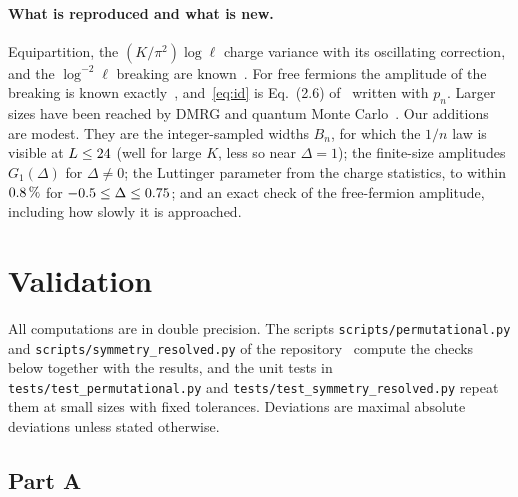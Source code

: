 \documentclass[11pt]{article}
\newcommand{\code}[1]{\nolinkurl{#1}}
\begin{document}
\paragraph{What is reproduced and what is new.} Equipartition, the $(K/\pi^2)\log\ell$ charge variance with its
oscillating correction, and the $\log^{-2}\ell$ breaking are
known~\cite{goldstein2018,xavier2018,bonsignori2019,song2012,estienne2021}. For free fermions the amplitude of the
breaking is known exactly~\cite{bonsignori2019}, and~\eqref{eq:id} is Eq.~(2.6) of~\cite{bonsignori2019} written with
$p_n$. Larger sizes have been reached by DMRG and quantum Monte Carlo~\cite{laflorencie2014,xavier2018,chen2026}. Our
additions are modest. They are the integer-sampled widths $B_n$, for which the $1/n$ law is visible at $L\le24$ (well
for large $K$, less so near $\Delta=1$); the finite-size amplitudes $G_1(\Delta)$ for $\Delta\ne0$; the Luttinger
parameter from the charge statistics, to within $0.8\,\%$ for $-0.5\le\Delta\le0.75$;
and an exact check of the free-fermion amplitude, including how slowly it is approached.

\section{Validation}\label{sec:validation}

All computations are in double precision. The scripts \code{scripts/permutational.py} and
\code{scripts/symmetry_resolved.py} of the repository~\cite{lib} compute the checks below together with the results,
and the unit tests in \code{tests/test_permutational.py} and \code{tests/test_symmetry_resolved.py} repeat them at
small sizes with fixed tolerances. Deviations are maximal absolute deviations unless stated otherwise.

\subsection{Part A}
\end{document}
